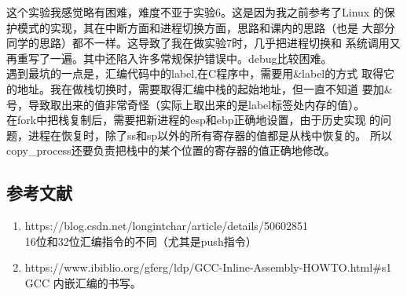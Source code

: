 \documentclass[a4paper]{article}
\begin{document}
    这个实验我感觉略有困难，难度不亚于实验6。这是因为我之前参考了Linux
    的保护模式的实现，其在中断方面和进程切换方面，思路和课内的思路（也是
    大部分同学的思路）都不一样。这导致了我在做实验7时，几乎把进程切换和
    系统调用又再重写了一遍。其中还陷入许多常规保护错误中。debug比较困难。\\ 

    遇到最坑的一点是，汇编代码中的label,在C程序中，需要用\&label的方式
    取得它的地址。我在做栈切换时，需要取得汇编中栈的起始地址，但一直不知道
    要加\&号，导致取出来的值非常奇怪（实际上取出来的是label标签处内存的值）。\\ 

    在fork中把栈复制后，需要把新进程的esp和ebp正确地设置，由于历史实现
    的问题，进程在恢复时，除了ss和sp以外的所有寄存器的值都是从栈中恢复的。
    所以copy\_process还要负责把栈中的某个位置的寄存器的值正确地修改。
\begin{appendices}
\section{参考文献} \label{sec:reference}
\begin{enumerate}
    \item https://blog.csdn.net/longintchar/article/details/50602851 \\
    16位和32位汇编指令的不同（尤其是push指令）
    \item https://www.ibiblio.org/gferg/ldp/GCC-Inline-Assembly-HOWTO.html\#s1 \\
    GCC 内嵌汇编的书写。
  \end{enumerate}
\end{appendices}
\end{document}
